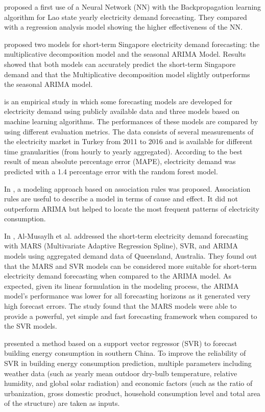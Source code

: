 \cite{5686767} proposed a first use of a Neural Network (NN) with the Backpropagation learning algorithm for Lao state yearly electricity demand forecasting.
They compared with a regression analysis model showing the higher effectiveness of the NN.

\cite{5518553} proposed two models for short-term Singapore electricity demand forecasting: the multiplicative decomposition model and the seasonal ARIMA Model.
Results showed that both models can accurately predict the short-term Singapore demand and that the Multiplicative decomposition model slightly outperforms the seasonal ARIMA model.

\cite{8093428} is an empirical study in which some forecasting models are developed for electricity demand using publicly available data and three models based on machine learning algorithms.
The performances of these models are compared by using different evaluation metrics.
The data consists of several measurements of the electricity market in Turkey from 2011 to 2016 and is available for different time granularities (from hourly to yearly aggregated).
According to the best result of mean absolute percentage error (MAPE), electricity demand was predicted with a 1.4 percentage error with the random forest model.

In \cite{9046493}, a modeling approach based on association rules was proposed.
Association rules are useful to describe a model in terms of cause and effect.
It did not outperform ARIMA but helped to locate the most frequent patterns of electricity consumption.

In \cite{ALMUSAYLH20181}, Al-Musaylh et al. addressed the short-term electricity demand forecasting with MARS (Multivariate Adaptive Regression Spline), SVR, and ARIMA models using aggregated demand data of Queensland, Australia.
They found out that the MARS and SVR models can be considered more suitable for short-term electricity demand forecasting when compared to the ARIMA model.
As expected, given its linear formulation in the modeling process, the ARIMA model’s performance was lower for all forecasting horizons as it generated very high forecast errors.
The study found that the MARS models were able to provide a powerful, yet simple and fast forecasting framework when compared to the SVR models.

\cite{MA20193433} presented a method based on a support vector regressor (SVR) to forecast building energy consumption in southern China.
To improve the reliability of SVR in building energy consumption prediction, multiple parameters including weather data (such as yearly mean outdoor dry-bulb temperature, relative humidity, and global solar radiation) and economic factors (such as the ratio of urbanization, gross domestic product, household consumption level and total area of the structure) are taken as inputs.

